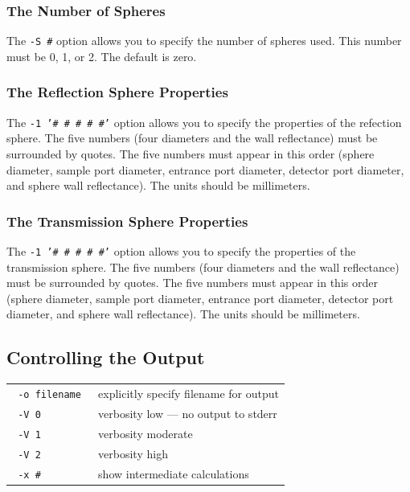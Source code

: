 \documentclass{article}
\begin{document}
\subsubsection{The Number of Spheres}
The \texttt{-S \#} option allows you to specify the number of spheres used.
This number must be 0, 1, or 2.  The default is zero.

\subsubsection{The Reflection Sphere Properties}
The \texttt{-1 '\# \# \# \# \#'} option allows you to specify the properties
of the refection sphere. The five numbers (four diameters and the wall reflectance)
must be surrounded by quotes.  The 
five numbers must appear in this order (sphere diameter, sample port diameter,
entrance port diameter, detector port diameter, and sphere wall reflectance).
The units should be millimeters.

\subsubsection{The Transmission Sphere Properties}
The \texttt{-1 '\# \# \# \# \#'} option allows you to specify the properties
of the transmission sphere. The five numbers (four diameters and the wall reflectance)
must be surrounded by quotes.  The 
five numbers must appear in this order (sphere diameter, sample port diameter,
entrance port diameter, detector port diameter, and sphere wall reflectance).
The units should be millimeters.
\clearpage


\subsection{Controlling the Output}
\begin{center}
\begin{tabular}{lp{7cm}}
\texttt{ -o filename         }& explicitly specify filename for output     \\
\texttt{ -V 0                }& verbosity low --- no output to stderr      \\
\texttt{ -V 1                }& verbosity moderate                         \\
\texttt{ -V 2                }& verbosity high                             \\
\texttt{ -x \#               }& show intermediate calculations             \\
\end{tabular}
\end{center}
\end{document}

